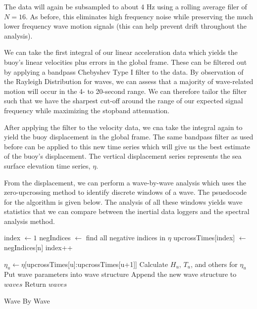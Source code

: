 The data will again be subsampled to about 4 Hz using a rolling average filer of $N=16$. 
As before, this eliminates high frequency noise while preserving the much lower frequency wave motion signals (this can help prevent drift throughout the analysis).

We can take the first integral of our linear acceleration data which yields the buoy’s linear velocities plus errors in the global frame. 
These can be filtered out by applying a bandpass Chebyshev Type I filter to the data. 
By observation of the Rayleigh Distribution for waves, we can assess that a majority of wave-related motion will occur in the 4- to 20-second range. 
We can therefore tailor the filter such that we have the sharpest cut-off around the range of our expected signal frequency while maximizing the stopband attenuation.

After applying the filter to the velocity data, we cna take the integral again to yield the buoy displacement in the global frame. 
The same bandpass filter as used before can be applied to this new time series which will give us the best estimate of the buoy’s displacement. 
The vertical displacement series represents the sea surface elevation time series, $\eta$.

From the displacement, we can perform a wave-by-wave analysis which uses the zero-upcrossing method to identify discrete windows of a wave. 
The psuedocode for the algorithm is given below. 
The analysis of all these windows yields wave statistics that we can compare between the inertial data loggers and the spectral analysis method.

\begin{algorithm}
    \begin{algorithmic}[1]
        \State index $\longleftarrow 1$
        \State negIndices $\longleftarrow$ find all negative indices in $\eta$ 
                \State upcrossTimes[index] $\longleftarrow$ negIndices[n]
                \State index++
            \EndIf
        \EndFor

            \State $\eta_u \longleftarrow \eta$[upcrossTimes[u]:upcrossTimes[u+1]]
            \State Calculate $H_u$, $T_u$, and others for $\eta_u$
            \State Put wave parameters into wave structure
            \State Append the new wave structure to $waves$
        \EndFor
        \State Return $waves$
        \EndFunction
    \end{algorithmic}
    \caption{Wave By Wave}\label{alg:wave_by_wave}
\end{algorithm}

